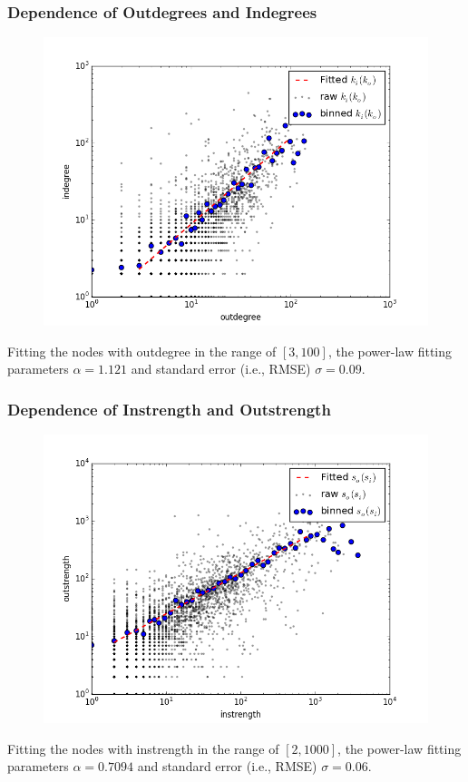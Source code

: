 \documentclass{beamer}
\begin{document}
\begin{frame}
\frametitle{Dependence of Outdegrees and Indegrees}
\begin{figure}
\includegraphics[width=0.8\linewidth]{figs/in_out_degree.png}
\end{figure}
\small{Fitting the nodes with outdegree in the range of $[3, 100]$, the power-law fitting parameters $\alpha=1.121 $ and standard error (i.e., RMSE) $\sigma= 0.09$.}
\end{frame}


\begin{frame}
\frametitle{Dependence of Instrength and Outstrength}
\begin{figure}
\includegraphics[width=0.8\linewidth]{figs/out_in_strength.png}
\end{figure}
\small{Fitting the nodes with instrength in the range of $[2, 1000]$, the power-law fitting parameters $\alpha=0.7094$ and standard error (i.e., RMSE) $\sigma= 0.06$.}
\end{frame}
\end{document}
